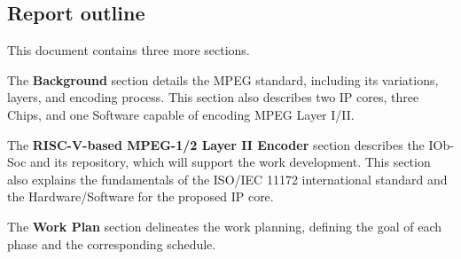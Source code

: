 

\subsection{Report outline}

This document contains three more sections.

The \textbf{Background} section details the MPEG standard, including its variations, layers, and encoding process. This section also describes two IP cores, three Chips, and one Software capable of encoding MPEG Layer I/II.

The \textbf{RISC-V-based MPEG-1/2 Layer II Encoder} section describes the IOb-Soc and its repository, which will support the work development. This section also explains the fundamentals of the ISO/IEC 11172 international standard and the Hardware/Software for the proposed IP core.

The \textbf{Work Plan} section delineates the work planning, defining the goal of each phase and the corresponding schedule.